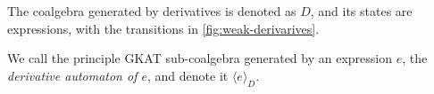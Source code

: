 \documentclass{extarticle}
\newcommand\altxrightarrow[2][0pt]{\mathrel{\ensurestackMath{\stackengine%
  {\dimexpr#1-7.5pt}{\xrightarrow{\phantom{#2}}}{\scriptstyle\!#2\,}%
  {O}{c}{F}{F}{S}}}}
\newcommand{\transvia}[1]{
    \mathrel{\raisebox{-2px}{\(\altxrightarrow[-2px]{#1}\)}}
}
\newcommand{\transAcc}[2]{⇒_{#1} #2}
\begin{document}
The coalgebra generated by derivatives is denoted as \(D\), and its states are expressions, with the transitions in \cref{fig:weak-derivarives}.
\begin{figure*}
    \caption{derivative rules}\label{fig:weak-derivarives}
\end{figure*}
We call the principle GKAT sub-coalgebra generated by an expression \(e\), the \emph{derivative automaton of \(e\)}, and denote it \(⟨e⟩_D\).
\end{document}
